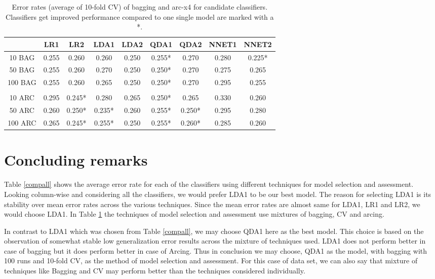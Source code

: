 \documentclass[a4paper,12pt]{article}
\begin{document}
\begin{table}
\begin{center}
\caption[arc-nnet]{Error rates (average of 10-fold CV) of bagging and arc-x4 for candidate classifiers. Classifiers get improved performance compared to one single model are marked with a *.}
\label{perftab}
\begin{tabular}{ccccccccc}
\hline
        & LR1   & LR2   & LDA1  & LDA2  & QDA1  & QDA2  & NNET1 & NNET2 \\
\hline
10 BAG  & 0.255 & 0.260 & 0.260 & 0.250 & 0.255*& 0.270 & 0.280 & 0.225* \\
50 BAG  & 0.255 & 0.260 & 0.270 & 0.250 & 0.250*& 0.270 & 0.275 & 0.265 \\
100 BAG & 0.255 & 0.260 & 0.265 & 0.250 & 0.250*& 0.270 & 0.295 & 0.255 \\
&&&&&&&&\\
10 ARC  & 0.295 & 0.245*& 0.280 & 0.265 & 0.250*& 0.265 & 0.330 & 0.260 \\
50 ARC  & 0.260 & 0.250*& 0.235*& 0.260 & 0.255*& 0.250*& 0.295 & 0.280 \\
100 ARC & 0.265 & 0.245*& 0.255*& 0.250 & 0.255*& 0.260*& 0.285 & 0.260 \\
\hline
\end{tabular}
\end{center}
\end{table}


\section{Concluding remarks}

Table \ref{compall} shows the average error rate for each of the classifiers using different techniques for model selection and assessment. Looking column-wise and considering all the classifiers, we would prefer LDA1 to be our best model. The reason for selecting LDA1 is its stability over mean error rates across the various techniques. Since the mean error rates are almost same for LDA1, LR1 and LR2, we would choose LDA1. In Table \ref{perftab} the techniques of model selection and assessment use mixtures of bagging, CV and arcing. \par

In contrast to LDA1 which was chosen from Table \ref{compall}, we may choose QDA1 here as the best model. This choice is based on the observation of somewhat stable low generalization error results across the mixture of techniques used. LDA1 does not perform better in case of bagging but it does perform better in case of Arcing. Thus in conclusion we may choose, QDA1 as the model, with bagging with 100 runs and 10-fold CV, as the method of model selection and assessment. For this case of data set, we can also say that mixture of techniques like Bagging and CV may perform better than the techniques considered individually.\par
\end{document}
